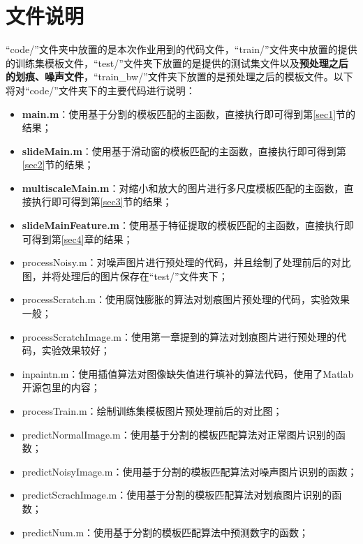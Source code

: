 \documentclass[cn]{elegantbook}
\begin{document}
\chapter{文件说明}
“code/”文件夹中放置的是本次作业用到的代码文件，“train/”文件夹中放置的提供的训练集模板文件，“test/”文件夹下放置的是提供的测试集文件以及\textbf{预处理之后的划痕、噪声文件}，“train\_bw/”文件夹下放置的是预处理之后的模板文件。以下将对“code/”文件夹下的主要代码进行说明：
\begin{itemize}
	\item \textbf{main.m}：使用基于分割的模板匹配的主函数，直接执行即可得到第\ref{sec1}节的结果；
	\item \textbf{slideMain.m}：使用基于滑动窗的模板匹配的主函数，直接执行即可得到第\ref{sec2}节的结果；
	\item \textbf{multiscaleMain.m}：对缩小和放大的图片进行多尺度模板匹配的主函数，直接执行即可得到第\ref{sec3}节的结果；
	\item \textbf{slideMainFeature.m}：使用基于特征提取的模板匹配的主函数，直接执行即可得到第\ref{sec4}章的结果；
	\item processNoisy.m：对噪声图片进行预处理的代码，并且绘制了处理前后的对比图，并将处理后的图片保存在“test/”文件夹下；
	\item processScratch.m：使用腐蚀膨胀的算法对划痕图片预处理的代码，实验效果一般；
	\item processScratchImage.m：使用第一章提到的算法对划痕图片进行预处理的代码，实验效果较好；
	\item inpaintn.m：使用插值算法对图像缺失值进行填补的算法代码，使用了Matlab开源包里的内容；
	\item processTrain.m：绘制训练集模板图片预处理前后的对比图；
	\item predictNormalImage.m：使用基于分割的模板匹配算法对正常图片识别的函数；
	\item predictNoisyImage.m：使用基于分割的模板匹配算法对噪声图片识别的函数；
	\item predictScrachImage.m：使用基于分割的模板匹配算法对划痕图片识别的函数；
	\item predictNum.m：使用基于分割的模板匹配算法中预测数字的函数；
\end{itemize}
\end{document}
